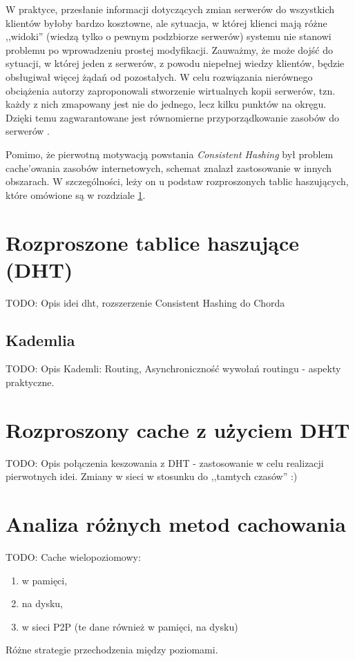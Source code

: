 \documentclass[a4paper,11pt]{scrartcl}
\newcommand{\s}{ }
\newcommand{\kesz}{cache}
\newcommand{\keszowania}{cache'owania}
\begin{document}
W praktyce, przesłanie informacji dotyczących zmian serwerów do wszystkich klientów byłoby bardzo kosztowne, ale sytuacja, w której klienci mają różne ,,widoki'' (wiedzą tylko o pewnym podzbiorze serwerów) systemu nie stanowi problemu po wprowadzeniu prostej modyfikacji. Zauważmy, że może dojść do sytuacji, w której jeden z serwerów, z powodu niepełnej wiedzy klientów, będzie obsługiwał więcej żądań od pozostałych. W celu rozwiązania nierównego obciążenia autorzy zaproponowali stworzenie wirtualnych kopii serwerów, tzn. każdy z nich zmapowany jest nie do jednego, lecz kilku punktów na okręgu. Dzięki temu zagwarantowane jest równomierne przyporządkowanie zasobów do serwerów \cite{karger1999web}.

Pomimo, że pierwotną motywacją powstania \textit{Consistent Hashing} był problem \keszowania\s zasobów internetowych, schemat znalazł zastosowanie w innych obszarach. W szczególności, leży on u podstaw rozproszonych tablic haszujących, które omówione są w rozdziale \ref{sect_dht}.

\section{Rozproszone tablice haszujące (DHT)}
\label{sect_dht}

TODO: Opis idei dht, rozszerzenie Consistent Hashing do Chorda
 
 
\subsection{Kademlia}
TODO: Opis Kademli: Routing, Asynchroniczność wywołań routingu - aspekty praktyczne.

\section{Rozproszony \kesz\s z użyciem DHT}
TODO: Opis połączenia keszowania z DHT - zastosowanie w celu realizacji pierwotnych idei. Zmiany w sieci w stosunku do ,,tamtych czasów'' :)

\section{Analiza różnych metod cachowania}
TODO:
Cache wielopoziomowy:
\begin{enumerate}
  \item w pamięci,
  \item na dysku,
  \item w sieci P2P (te dane również w pamięci, na dysku)
\end{enumerate}
Różne strategie przechodzenia między poziomami.
\end{document}
